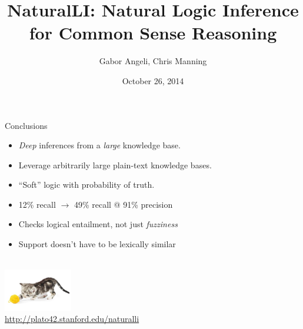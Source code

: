 \documentclass[hyperref]{beamer}
\title{NaturalLI: Natural Logic Inference for Common Sense Reasoning}
\subtitle{}
\author{Gabor Angeli, Chris Manning}
\date{October 26, 2014}
\institute[Stanford]{Stanford University}
\begin{document}
\begin{frame}[noframenumbering]
  \titlepage
\end{frame}








\begin{frame}{Conclusions}
\begin{itemize}
  \item \textit{Deep} inferences from a \textit{large} knowledge base.
  \item Leverage arbitrarily large plain-text knowledge bases.
  \item ``Soft'' logic with probability of truth.
\end{itemize}
\vspace{0.5cm}
\pause

\begin{itemize}
  \item 12\% recall $\rightarrow$ 49\% recall @ 91\% precision
\end{itemize}
\vspace{0.25cm}
\pause

\begin{itemize}
  \item Checks logical entailment, not just \textit{fuzziness}
  \item Support doesn't have to be lexically similar
\end{itemize}
\end{frame}

\begin{frame}[noframenumbering]{}
\begin{center}
   \\
  \vspace{1cm}
  \includegraphics[width=3cm]{../../img/yarn-cat.jpg} \\
  \vspace{1cm}
  \url{http://plato42.stanford.edu/naturalli}
\end{center}
\end{frame}
\end{document}
